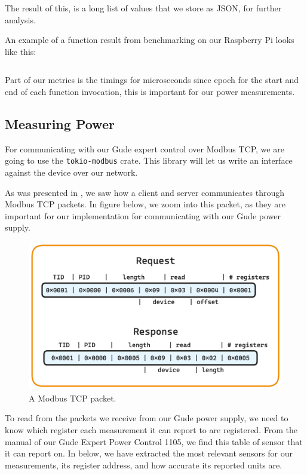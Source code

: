 \documentclass[
  table]{report}
\begin{document}
The result of this, is a long list of values that we store as JSON, for
further analysis.

An example of a function result from benchmarking on our Raspberry Pi
looks like this:

\inputminted{json}{assets/code/result_example.json}

Part of our metrics is the timings for microseconds since epoch for the
start and end of each function invocation, this is important for our
power measurements.

\subsection{Measuring Power}

For communicating with our Gude expert control over Modbus TCP, we are
going to use the \texttt{tokio-modbus} crate. This library will let us
write an interface against the device over our network.

As was presented in , we saw how a client and
server communicates through Modbus TCP packets. In figure
 below, we zoom into this packet, as they
are important for our implementation for communicating with our Gude
power supply.

\begin{figure}[H]
\centering
  \includegraphics[width=0.7\columnwidth]{assets/6-modbus_packet.png}
  \caption{A Modbus TCP packet.}
  \label{fig:modbus_tcp_packet}
\end{figure}

To read from the packets we receive from our Gude power supply, we need
to know which register each measurement it can report to are registered.
From the manual of our Gude Expert Power Control 1105, we find this
table of sensor that it can report on. In  below,
we have extracted the most relevant sensors for our measurements, its
register address, and how accurate its reported units are.
\end{document}
